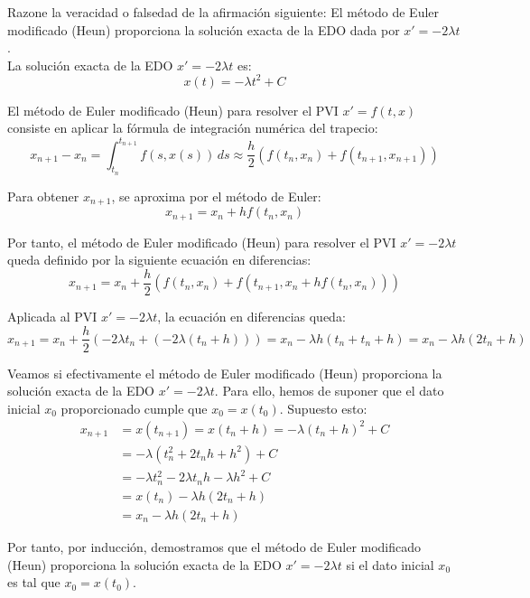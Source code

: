 \begin{ejercicio}\label{ej:3.1.4}
    Razone la veracidad o falsedad de la afirmación siguiente: El método de Euler modificado (Heun) proporciona la solución exacta de la EDO dada por $x' = -2\lambda t$.\\

    La solución exacta de la EDO $x' = -2\lambda t$ es:
    \begin{equation*}
        x(t) = -\lambda t^2 + C
    \end{equation*}

    El método de Euler modificado (Heun) para resolver el PVI $x' = f(t, x)$ consiste en aplicar la fórmula de integración numérica del trapecio:
    \begin{equation*}
        x_{n+1} - x_n = \int_{t_n}^{t_{n+1}} f(s, x(s))\, ds \approx \frac{h}{2} \left( f(t_n, x_n) + f(t_{n+1}, x_{n+1}) \right)
    \end{equation*}

    Para obtener $x_{n+1}$, se aproxima por el método de Euler:
    \begin{equation*}
        x_{n+1} = x_n + h f(t_n, x_n)
    \end{equation*}

    Por tanto, el método de Euler modificado (Heun) para resolver el PVI $x' = -2\lambda t$ queda definido por la siguiente ecuación en diferencias:
    \begin{equation*}
        x_{n+1} = x_n + \frac{h}{2} \left( f(t_n, x_n) + f(t_{n+1}, x_n + h f(t_n, x_n)) \right)
    \end{equation*}

    Aplicada al PVI $x' = -2\lambda t$, la ecuación en diferencias queda:
    \begin{equation*}
        x_{n+1} = x_n + \frac{h}{2} \left( -2\lambda t_n + (-2\lambda (t_n + h)) \right)
        = x_n - \lambda h (t_n + t_ n + h)
        = x_n - \lambda h (2t_n + h)
    \end{equation*}

    Veamos si efectivamente el método de Euler modificado (Heun) proporciona la solución exacta de la EDO $x' = -2\lambda t$. Para ello, hemos de suponer que el dato inicial $x_0$ proporcionado cumple que $x_0 = x(t_0)$. Supuesto esto:
    \begin{align*}
        x_{n+1} &= x(t_{n+1}) = x(t_n + h) = -\lambda (t_n + h)^2 + C \\
        &= -\lambda (t_n^2 + 2t_n h + h^2) + C \\
        &= -\lambda t_n^2 - 2\lambda t_n h - \lambda h^2 + C \\
        &= x(t_n) - \lambda h (2t_n + h) \\
        &= x_n - \lambda h (2t_n + h)
    \end{align*}

    Por tanto, por inducción, demostramos que el método de Euler modificado (Heun) proporciona la solución exacta de la EDO $x' = -2\lambda t$ si el dato inicial $x_0$ es tal que $x_0 = x(t_0)$.
\end{ejercicio}

